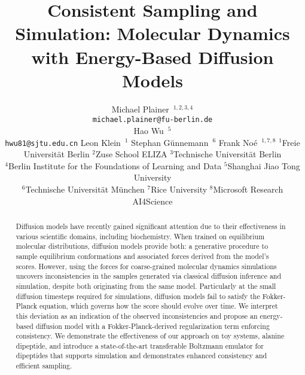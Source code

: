 \documentclass{article}
\title{Consistent Sampling and Simulation: Molecular Dynamics with Energy-Based Diffusion Models}
\author{
  Michael Plainer~$^{1,2,3,4}$\\
  \texttt{michael.plainer@fu-berlin.de}
  \\
  \And Hao Wu~$^{5}$ \\
  \texttt{hwu81@sjtu.edu.cn}
  \AND Leon Klein~$^{1}$%
  \And Stephan Günnemann~$^{6}$
  \And Frank Noé~$^{1,7,8}$
  \AND \textnormal{
  $^{1}$Freie Universität Berlin \quad
  $^{2}$Zuse School ELIZA \quad
  $^{3}$Technische Universität Berlin
  } \\
  \textnormal{
  $^{4}$Berlin Institute for the Foundations of Learning and Data
  $^{5}$Shanghai Jiao Tong University \quad
  } \\
  \textnormal{
  $^{6}$Technische Universität München \quad
  $^{7}$Rice University \quad
  $^{8}$Microsoft Research AI4Science \quad
  }
}
\begin{document}
\maketitle

\begin{abstract}
    Diffusion models have recently gained significant attention due to their effectiveness in various scientific domains, including biochemistry. When trained on equilibrium molecular distributions, diffusion models provide both: a generative procedure to sample equilibrium conformations and associated forces derived from the model's scores. However, using the forces for coarse-grained molecular dynamics simulations uncovers inconsistencies in the samples generated via classical diffusion inference and simulation, despite both originating from the same model. Particularly at the small diffusion timesteps required for simulations, diffusion models fail to satisfy the Fokker-Planck equation, which governs how the score should evolve over time. We interpret this deviation as an indication of the observed inconsistencies and propose an energy-based diffusion model with a Fokker-Planck-derived regularization term enforcing consistency. We demonstrate the effectiveness of our approach on toy systems, alanine dipeptide, and introduce a state-of-the-art transferable Boltzmann emulator for dipeptides that supports simulation and demonstrates enhanced consistency and efficient sampling.
\end{abstract} 












\clearpage
\appendix






%
\end{document}
